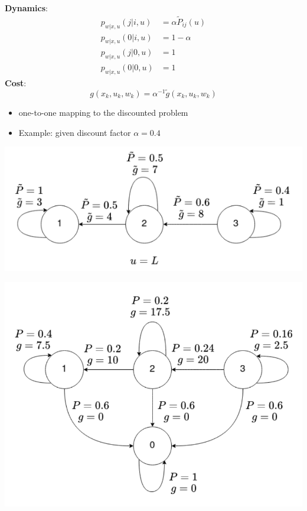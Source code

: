 \documentclass[landscape,a0paper,fontscale=0.285]{baposter} %
\begin{document}
\begin{poster}
{\textbf{Dynamics}:\vspace{-0.5cm}
$$
\begin{aligned}
p_{w|x,u}(j|i,u) &= \alpha \tilde{P}_{ij}(u) \\
p_{w|x,u}(0|i,u) &= 1-\alpha \\
p_{w|x,u}(j|0,u) &= 1 \\
p_{w|x,u}(0|0,u) &= 1
\end{aligned}
$$
\textbf{Cost}:\vspace{-0.5cm}
$$
g(x_k,u_k,w_k) = \alpha^{-1}\tilde{g}(x_k,u_k,w_k)
$$
\begin{itemize}
  \item one-to-one mapping to the discounted problem
  \item Example: given discount factor \(\alpha=0.4\)
\end{itemize}

\begin{minipage}{0.5\textwidth}
\centering
\includegraphics[width=\textwidth]{images/auxSSP_src.png}

\end{minipage}
\hfill
\begin{minipage}{0.475\textwidth}
\centering
\includegraphics[width=\textwidth]{images/auxSSP_dst.png}
\end{minipage}

}
\end{poster}
\end{document}
